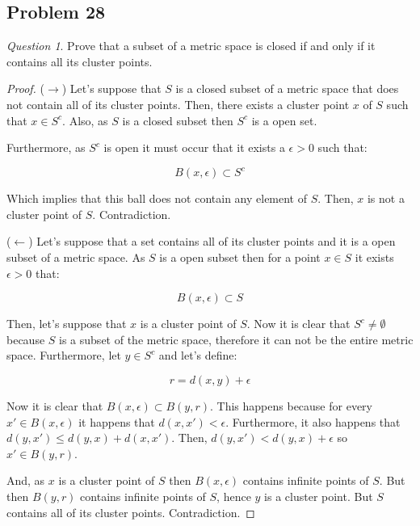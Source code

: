 \documentclass[11pt]{article}
\theoremstyle{definition}
\theoremstyle{remark}
\theoremstyle{remark}
\newtheorem{question}{Question}
\begin{document}
\subsection{Problem 28}
\begin{question}
  Prove that a subset of a metric space is closed if and only if it
  contains all its cluster points.
\end{question}

\begin{proof}
  ($\rightarrow$) Let's suppose that $S$ is a closed subset of a metric
  space that does not contain all of its cluster points. Then, there
  exists a cluster point $x$ of $S$ such that $x \in S^c$. Also,
  as $S$ is a closed subset then $S^c$ is a open set.

  Furthermore, as $S^c$ is open it must occur that it exists a
  $\epsilon > 0$ such that:

  \begin{equation}
    B(x, \epsilon) \subset S^c
  \end{equation}

  Which implies that this ball does not contain any element of
  $S$. Then, $x$ is not a cluster point of $S$. Contradiction.

  ($\leftarrow$) Let's suppose that a set contains all of its cluster
  points and it is a open subset of a metric space. As $S$ is a open
  subset then for a point $x \in S$ it exists $\epsilon > 0$ that:

  \begin{equation}
    B(x, \epsilon) \subset S
  \end{equation}

  Then, let's suppose that $x$ is a cluster point of $S$. Now it is
  clear that $S^c \ne \emptyset$ because $S$ is a subset of the
  metric space, therefore it can not be the entire metric
  space. Furthermore, let $y \in S^c$ and let's define:

  \begin{equation}
    r = d(x, y) + \epsilon
  \end{equation}

  Now it is clear that $B(x, \epsilon) \subset B(y, r)$. This happens
  because for every $x' \in B(x, \epsilon)$ it happens that
  $d(x,x') < \epsilon$. Furthermore, it also happens that
  $d(y,x') \le d(y, x) + d(x,x')$. Then,
  $d(y,x') < d(y,x) + \epsilon$ so $x' \in B(y, r)$.

  And, as $x$ is a cluster point of $S$ then $B(x, \epsilon)$
  contains infinite points of $S$. But then $B(y, r)$ contains
  infinite points of $S$, hence $y$ is a cluster point. But $S$
  contains all of its cluster points. Contradiction.
\end{proof}
\end{document}
